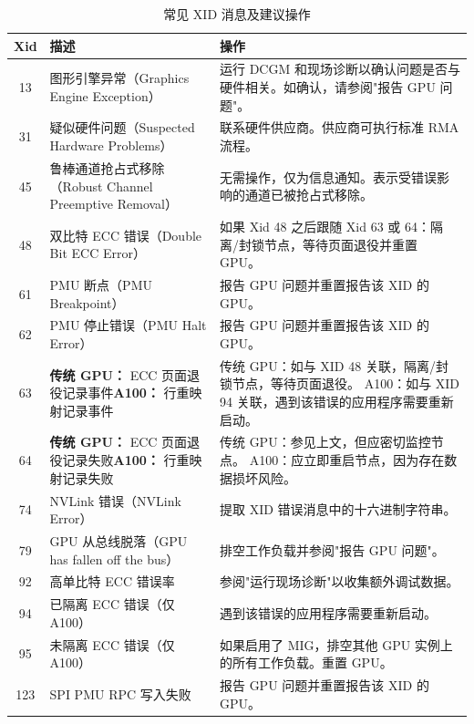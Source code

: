 \documentclass[11pt,UTF8,fontset=fandol,openany]{ctexrep}
\begin{document}
\begin{table}[H]
\centering
\caption{常见 XID 消息及建议操作}
\label{tab:xid}
\small
\begin{tabular}{c p{5.2cm} p{7.2cm}}
\toprule
\textbf{Xid} & \textbf{描述} & \textbf{操作} \\
\midrule
13 & 图形引擎异常（Graphics Engine Exception） &
  运行 DCGM 和现场诊断以确认问题是否与硬件相关。如确认，请参阅"报告 GPU 问题"。\\
\midrule
31 & 疑似硬件问题（Suspected Hardware Problems） &
  联系硬件供应商。供应商可执行标准 RMA 流程。\\
\midrule
45 & 鲁棒通道抢占式移除（Robust Channel Preemptive Removal） &
  无需操作，仅为信息通知。表示受错误影响的通道已被抢占式移除。\\
\midrule
48 & 双比特 ECC 错误（Double Bit ECC Error） &
  如果 Xid 48 之后跟随 Xid 63 或 64：隔离/封锁节点，等待页面退役并重置 GPU。\\
\midrule
61 & PMU 断点（PMU Breakpoint） &
  报告 GPU 问题并重置报告该 XID 的 GPU。\\
\midrule
62 & PMU 停止错误（PMU Halt Error） &
  报告 GPU 问题并重置报告该 XID 的 GPU。\\
\midrule
63 & \textbf{传统 GPU：} ECC 页面退役记录事件\newline \textbf{A100：} 行重映射记录事件 &
  传统 GPU：如与 XID 48 关联，隔离/封锁节点，等待页面退役。\newline
  A100：如与 XID 94 关联，遇到该错误的应用程序需要重新启动。\\
\midrule
64 & \textbf{传统 GPU：} ECC 页面退役记录失败\newline \textbf{A100：} 行重映射记录失败 &
  传统 GPU：参见上文，但应密切监控节点。\newline
  A100：应立即重启节点，因为存在数据损坏风险。\\
\midrule
74 & NVLink 错误（NVLink Error） &
  提取 XID 错误消息中的十六进制字符串。\\
\midrule
79 & GPU 从总线脱落（GPU has fallen off the bus） &
  排空工作负载并参阅"报告 GPU 问题"。\\
\midrule
92 & 高单比特 ECC 错误率 &
  参阅"运行现场诊断"以收集额外调试数据。\\
\midrule
94 & 已隔离 ECC 错误（仅 A100） &
  遇到该错误的应用程序需要重新启动。\\
\midrule
95 & 未隔离 ECC 错误（仅 A100） &
  如果启用了 MIG，排空其他 GPU 实例上的所有工作负载。重置 GPU。\\
\midrule
123 & SPI PMU RPC 写入失败 &
  报告 GPU 问题并重置报告该 XID 的 GPU。\\
\bottomrule
\end{tabular}
\end{table}
\end{document}
